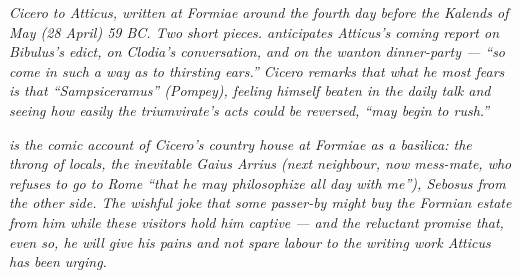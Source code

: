 
\textit{Cicero to Atticus, written at Formiae around the
fourth day before the Kalends of May (28 April) 59 BC. Two
short pieces.  anticipates Atticus's coming
report on Bibulus's edict, on Clodia's conversation, and on
the wanton dinner-party --- ``so come in such a way as to
thirsting ears.'' Cicero remarks that what he most fears is
that ``Sampsiceramus'' (Pompey), feeling himself beaten in
the daily talk and seeing how easily the triumvirate's acts
could be reversed, ``may begin to rush.''}

\textit{ is the comic account of Cicero's
country house at Formiae as a basilica: the throng of
locals, the inevitable Gaius Arrius (next neighbour, now
mess-mate, who refuses to go to Rome ``that he may
philosophize all day with me''), Sebosus from the other
side. The wishful joke that some passer-by might buy the
Formian estate from him while these visitors hold him
captive --- and the reluctant promise that, even so, he
will give his pains and not spare labour to the writing
work Atticus has been urging.}
